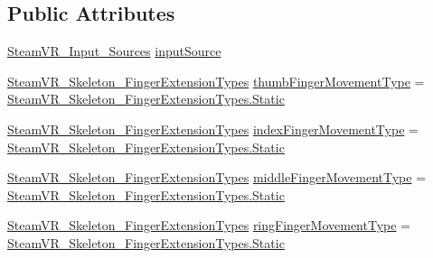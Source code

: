 \subsection*{Public Attributes}
\begin{DoxyCompactItemize}
\item 
\mbox{\hyperlink{namespace_valve_1_1_v_r_a82e5bf501cc3aa155444ee3f0662853f}{Steam\+V\+R\+\_\+\+Input\+\_\+\+Sources}} \mbox{\hyperlink{class_valve_1_1_v_r_1_1_steam_v_r___skeleton___pose___hand_a07abf8fdb1adaeefe2ceeea537e2e067}{input\+Source}}
\item 
\mbox{\hyperlink{namespace_valve_1_1_v_r_af4f7ce87893374f71b2fa2ba112642da}{Steam\+V\+R\+\_\+\+Skeleton\+\_\+\+Finger\+Extension\+Types}} \mbox{\hyperlink{class_valve_1_1_v_r_1_1_steam_v_r___skeleton___pose___hand_a4665f3a9254a6991ccf50ac84743b339}{thumb\+Finger\+Movement\+Type}} = \mbox{\hyperlink{namespace_valve_1_1_v_r_af4f7ce87893374f71b2fa2ba112642daa84a8921b25f505d0d2077aeb5db4bc16}{Steam\+V\+R\+\_\+\+Skeleton\+\_\+\+Finger\+Extension\+Types.\+Static}}
\item 
\mbox{\hyperlink{namespace_valve_1_1_v_r_af4f7ce87893374f71b2fa2ba112642da}{Steam\+V\+R\+\_\+\+Skeleton\+\_\+\+Finger\+Extension\+Types}} \mbox{\hyperlink{class_valve_1_1_v_r_1_1_steam_v_r___skeleton___pose___hand_a3d5f7f76110f73590014db5908702d6e}{index\+Finger\+Movement\+Type}} = \mbox{\hyperlink{namespace_valve_1_1_v_r_af4f7ce87893374f71b2fa2ba112642daa84a8921b25f505d0d2077aeb5db4bc16}{Steam\+V\+R\+\_\+\+Skeleton\+\_\+\+Finger\+Extension\+Types.\+Static}}
\item 
\mbox{\hyperlink{namespace_valve_1_1_v_r_af4f7ce87893374f71b2fa2ba112642da}{Steam\+V\+R\+\_\+\+Skeleton\+\_\+\+Finger\+Extension\+Types}} \mbox{\hyperlink{class_valve_1_1_v_r_1_1_steam_v_r___skeleton___pose___hand_ab8585d689476cc3a1a6b20b11df02a31}{middle\+Finger\+Movement\+Type}} = \mbox{\hyperlink{namespace_valve_1_1_v_r_af4f7ce87893374f71b2fa2ba112642daa84a8921b25f505d0d2077aeb5db4bc16}{Steam\+V\+R\+\_\+\+Skeleton\+\_\+\+Finger\+Extension\+Types.\+Static}}
\item 
\mbox{\hyperlink{namespace_valve_1_1_v_r_af4f7ce87893374f71b2fa2ba112642da}{Steam\+V\+R\+\_\+\+Skeleton\+\_\+\+Finger\+Extension\+Types}} \mbox{\hyperlink{class_valve_1_1_v_r_1_1_steam_v_r___skeleton___pose___hand_aba7575cade0e516ea2265066e02c1e89}{ring\+Finger\+Movement\+Type}} = \mbox{\hyperlink{namespace_valve_1_1_v_r_af4f7ce87893374f71b2fa2ba112642daa84a8921b25f505d0d2077aeb5db4bc16}{Steam\+V\+R\+\_\+\+Skeleton\+\_\+\+Finger\+Extension\+Types.\+Static}}
\item 

\end{DoxyCompactItemize}
